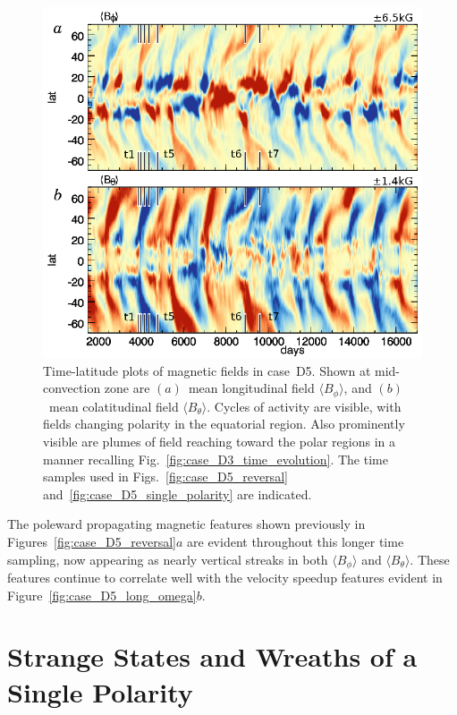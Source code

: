 \begin{figure}[!tp]
  \begin{center}
    \includegraphics[width=0.8\linewidth]{figs/chapter_6/Figure_11/Figure_11.eps}
  \end{center}
  \caption[Time-latitude plots of magnetic fields in case~D5]
          {Time-latitude plots of magnetic fields in case~D5.  
	    Shown at mid-convection zone are 
    $(a)$~mean longitudinal field $\langle B_\phi \rangle$, 
    and $(b)$~mean colatitudinal field $\langle B_\theta \rangle$.
    Cycles of activity are visible, with
    fields changing polarity in the equatorial region.  Also
    prominently visible are plumes of field reaching toward the
    polar regions in a manner recalling
    Fig.~\ref{fig:case_D3_time_evolution}.  The time samples used in
    Figs.~\ref{fig:case_D5_reversal} and~\ref{fig:case_D5_single_polarity}
    are indicated.
    \label{fig:case_D5_timelat}}
\end{figure}


\clearpage
The poleward propagating magnetic features shown previously in
Figures~\ref{fig:case_D5_reversal}$a$ are evident throughout this
longer time sampling, now appearing as nearly vertical streaks in both 
$\langle B_\phi \rangle$ and  $\langle B_\theta \rangle$.  These
features continue to correlate well with the velocity speedup features
evident in Figure~\ref{fig:case_D5_long_omega}$b$.


\section{Strange States and Wreaths of a Single Polarity}
\label{sec:D5_strange_states}

